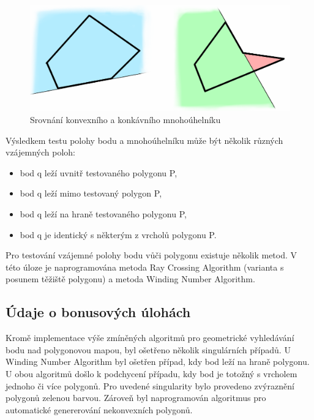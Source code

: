 \documentclass[a4paper,11pt,twoside]{article}
\begin{document}
\vspace{0.2cm}
\begin{figure}[hbt!] 
\begin{center}
\includegraphics[width=15cm]{pictures/Srovnani-konvex.png} 
\caption[Srovnání konvexního a konkávního mnohoúhelníku]{Srovnání konvexního a konkávního mnohoúhelníku \cite{srovnani_konvex}}
\label{fig:srovnani_konvex}
\end{center}
\end{figure}
\vspace{-0.4cm}

\noindent
\large
Výsledkem testu polohy bodu a mnohoúhelníku může být několik různých vzájemných poloh:
\begin{itemize}
		\item bod q leží uvnitř testovaného polygonu P,
		\item bod q leží mimo testovaný polygon P,
		\item bod q leží na hraně testovaného polygonu P,
		\item bod q je identický s některým z vrcholů polygonu P.
\end{itemize}

Pro testování vzájemné polohy bodu vůči polygonu existuje několik metod. V této úloze je naprogramována metoda Ray Crossing Algorithm (varianta s posunem těžiště polygonu) a metoda Winding Number Algorithm.

\subsection{Údaje o bonusových úlohách}
\large
\noindent Kromě implementace výše zmíněných algoritmů pro geometrické vyhledávání bodu nad polygonovou mapou, byl ošetřeno několik singulárních případů. U Winding Number Algorithm byl ošetřen případ, kdy bod leží na hraně polygonu. U obou algoritmů došlo k podchycení případu, kdy bod je totožný s vrcholem jednoho či více polygonů. Pro uvedené singularity bylo provedeno zvýraznění polygonů zelenou barvou. Zároveň byl naprogramován algoritmus pro automatické genererování nekonvexních polygonů. 
\end{document}
